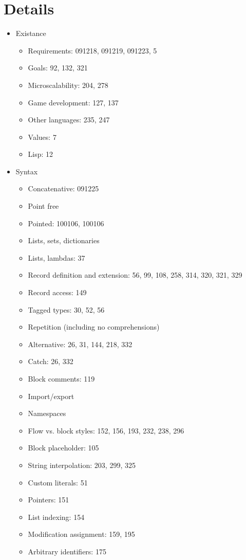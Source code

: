 \section{Details}
\begin{itemize}
\item Existance
  \begin{itemize}
  \item Requirements: 091218, 091219, 091223, 5
  \item Goals: 92, 132, 321
  \item Microscalability: 204, 278
  \item Game development: 127, 137
  \item Other languages: 235, 247
  \item Values: 7
  \item Lisp: 12
  \end{itemize}
\item Syntax
  \begin{itemize}
  \item Concatenative: 091225
  \item Point free
  \item Pointed: 100106, 100106
  \item Lists, sets, dictionaries
  \item Lists, lambdas: 37
  \item Record definition and extension: 56, 99, 108, 258, 314, 320, 321, 329
  \item Record access: 149
  \item Tagged types: 30, 52, 56
  \item Repetition (including no comprehensions)
  \item Alternative: 26, 31, 144, 218, 332
  \item Catch: 26, 332
  \item Block comments: 119
  \item Import/export
  \item Namespaces
  \item Flow vs. block styles: 152, 156, 193, 232, 238, 296
  \item Block placeholder: 105
  \item String interpolation: 203, 299, 325
  \item Custom literals: 51
  \item Pointers: 151
  \item List indexing: 154
  \item Modification assignment: 159, 195
  \item Arbitrary identifiers: 175

\end{itemize}
\end{itemize}
